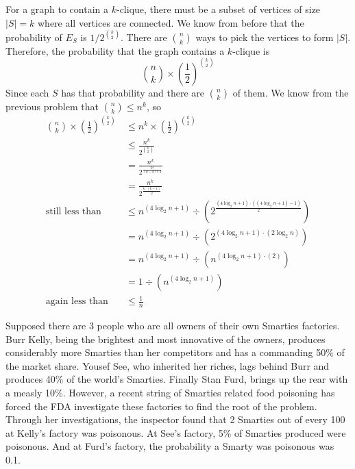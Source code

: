 \documentclass[11pt]{article}
\begin{document}
\begin{solution}
\begin{Parts}
\Part For a graph to contain a $k$-clique, there must be a subset of vertices
of size $|S|=k$ where all vertices are connected. We know from before that the 
probability of $E_S$ is $1 / 2^{\binom{k}{2}}$. There are $\binom{n}{k}$ ways 
to pick the vertices to form $|S|$. Therefore, the probability that the graph
contains a $k$-clique is
\[
    \binom{n}{k} \times \left( \frac{1}{2} \right)^{\binom{k}{2}}
\]
Since each $S$ has that probability and there are $\binom{n}{k}$ of them. We 
know from the previous problem that $\binom{n}{k} \leq n^k$, so
\[
    \begin{split}
        \binom{n}{k} \times \left( \frac{1}{2} \right)^{\binom{k}{2}} &\leq 
        n^k \times \left( \frac{1}{2} \right)^{\binom{k}{2}} \\
        &\leq \frac{n^k}{2^{\binom{k}{2}}} \\
        &= \frac{n^k}{2^\frac{k!}{(k-2)!\cdot 2}} \\
        &= \frac{n^k}{2^\frac{k\cdot(k-1)}{2}} \\
        \text{still less than} \quad &\leq n^{(4\log_2 n + 1)} \div \left( 2^\frac{(4\log_2 n + 1) \cdot((4\log_2 n + 1)-1)}{2} \right) \\
        &= n^{(4\log_2 n + 1)} \div \left( 2^{(4\log_2 n + 1) \cdot(2\log_2 n)} \right) \\
        &= n^{(4\log_2 n + 1)} \div \left( n^{(4\log_2 n + 1) \cdot(2)} \right) \\
        &= 1 \div \left( n^{(4\log_2 n + 1)} \right) \\
        \text{again less than} \quad &\leq \frac{1}{n}
    \end{split}
\]

\end{Parts}

\end{solution}


Supposed there are 3 people who are all owners of their own Smarties factories. Burr Kelly, being the brightest and most innovative of the owners, produces considerably more Smarties than her competitors and has a commanding 50\% of the market share. Yousef See, who inherited her riches, lags behind Burr and produces 40\% of the world's Smarties. Finally Stan Furd, brings up the rear with a measly 10\%. However, a recent string of Smarties related food poisoning has forced the FDA investigate these factories to find the root of the problem. Through her investigations, the inspector found that 2 Smarties out of every 100 at Kelly's factory was poisonous. At See's factory, 5\% of Smarties produced were poisonous. And at Furd's factory, the probability a Smarty was poisonous was 0.1. 
\end{document}
